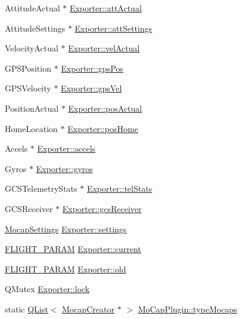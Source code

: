 \begin{DoxyCompactItemize}
Attitude\-Actual $\ast$ \hyperlink{group___mo_cap_plugin_gaa96960187d095cbbc69ba0cc08d776a7}{Exporter\-::att\-Actual}
\item 
Attitude\-Settings $\ast$ \hyperlink{group___mo_cap_plugin_gaa7be67cf3fe5bd561bfd56b81ace46d6}{Exporter\-::att\-Settings}
\item 
Velocity\-Actual $\ast$ \hyperlink{group___mo_cap_plugin_gaf7dc7b4cb9c561edf9c8df28131eeac3}{Exporter\-::vel\-Actual}
\item 
G\-P\-S\-Position $\ast$ \hyperlink{group___mo_cap_plugin_gab8839ee3d842d22d5717905f7dea20cd}{Exporter\-::gps\-Pos}
\item 
G\-P\-S\-Velocity $\ast$ \hyperlink{group___mo_cap_plugin_ga75de3c84f1e0fec7aec493cb1a27b9a8}{Exporter\-::gps\-Vel}
\item 
Position\-Actual $\ast$ \hyperlink{group___mo_cap_plugin_ga48e371afeb39f31ab368d804798313f5}{Exporter\-::pos\-Actual}
\item 
Home\-Location $\ast$ \hyperlink{group___mo_cap_plugin_ga9a7c0ada8bbd6bf8c95ca54f123befbe}{Exporter\-::pos\-Home}
\item 
Accels $\ast$ \hyperlink{group___mo_cap_plugin_ga4dd5a6587431c70720881c0540f065c9}{Exporter\-::accels}
\item 
Gyros $\ast$ \hyperlink{group___mo_cap_plugin_ga2b6042b4adabe6985d92cc22f33cfc9a}{Exporter\-::gyros}
\item 
G\-C\-S\-Telemetry\-Stats $\ast$ \hyperlink{group___mo_cap_plugin_gad3a5a6122f88f8f4b44847053a7d830b}{Exporter\-::tel\-Stats}
\item 
G\-C\-S\-Receiver $\ast$ \hyperlink{group___mo_cap_plugin_ga49b2f0b0762b95f0da3f7c4a7330b941}{Exporter\-::gcs\-Receiver}
\item 
\hyperlink{group___mo_cap_plugin_ga6083347a5b3eb70e360f599354dc0f0b}{Mocap\-Settings} \hyperlink{group___mo_cap_plugin_ga50484fe9f9410948c133b1c589f73f76}{Exporter\-::settings}
\item 
\hyperlink{group___h_i_t_l_plugin_ga7bda7a22b899fe8dff0ba9a0cae99da6}{F\-L\-I\-G\-H\-T\-\_\-\-P\-A\-R\-A\-M} \hyperlink{group___mo_cap_plugin_ga6c17ed61598da30f012113ffbff26816}{Exporter\-::current}
\item 
\hyperlink{group___h_i_t_l_plugin_ga7bda7a22b899fe8dff0ba9a0cae99da6}{F\-L\-I\-G\-H\-T\-\_\-\-P\-A\-R\-A\-M} \hyperlink{group___mo_cap_plugin_ga5ef84da1bd9cf4e1d625c33beb5a148c}{Exporter\-::old}
\item 
Q\-Mutex \hyperlink{group___mo_cap_plugin_ga55a5f9c6eb2d80cfc96523f4592f5417}{Exporter\-::lock}
\item 
static \hyperlink{class_q_list}{Q\-List}$<$ \hyperlink{class_mocap_creator}{Mocap\-Creator} $\ast$ $>$ \hyperlink{group___mo_cap_plugin_gaca68fd324d804c3124d7ba64b5d0294a}{Mo\-Cap\-Plugin\-::type\-Mocaps}
\end{DoxyCompactItemize}
